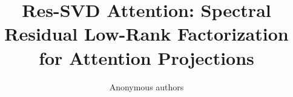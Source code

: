 \title{\textbf{Res-SVD Attention: Spectral Residual Low-Rank Factorization for Attention Projections}}

\author{Anonymous authors}
